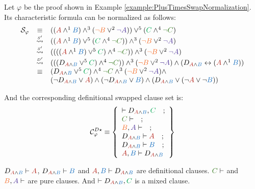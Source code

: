 \begin{example}
\label{example:PlusTimesSwappeDefinitionalNormalization}
Let $\varphi$ be the proof shown in Example \ref{example:PlusTimesSwapNormalization}.
Its characteristic formula can be normalized as follows:
$$
\begin{array}{rcl}
\struct{\varphi} 
& \equiv &
((\hA{A} \structplus^1 \hB{B}) \structplus^3 (\hC{\structdual{B}} \structtimes^2 \hD{\structdual{A}}))
\structtimes^5
(\hE{C} \structplus^4 \hF{\structdual{C}}) \\
%
& \normalizePlusTimesSDs &
	((\hA{A} \structplus^1 \hB{B})\structtimes^5 (\hE{C} \structplus^4 \hF{\structdual{C}}))
\structplus^3 
	(\hC{\structdual{B}} \structtimes^2 \hD{\structdual{A}}) \\
%
& \normalizePlusTimesSDs &
	((((\hA{A} \structplus^1 \hB{B})\structtimes^5 \hE{C}) \structplus^4 \hF{\structdual{C}}))
\structplus^3 
	(\hC{\structdual{B}} \structtimes^2 \hD{\structdual{A}}) \\
%
& \normalizePlusTimesSDd &
	(((D_{\hA{A} \structplus \hB{B}} \structtimes^5 \hE{C}) \structplus^4 \hF{\structdual{C}}))
\structplus^3 
	(\hC{\structdual{B}} \structtimes^2 \hD{\structdual{A}}) 
\structplus
(D_{\hA{A} \structplus \hB{B}} \biimp (\hA{A} \structplus^1 \hB{B})) \\
%
& \equiv &
	(D_{\hA{A} \structplus \hB{B}} \structtimes^5 \hE{C}) 
\structplus^4 
	\hF{\structdual{C}}
\structplus^3 
	(\hC{\structdual{B}} \structtimes^2 \hD{\structdual{A}}) 
\structplus \\
&		   &	
	(\neg D_{\hA{A} \structplus \hB{B}} \structtimes \hA{A} ) 
\structplus
	(\neg D_{\hA{A} \structplus \hB{B}} \structtimes \hB{B} )
\structplus
	(D_{\hA{A} \structplus \hB{B}} \structtimes (\neg \hA{A} \structtimes \neg \hB{B})) \\
\end{array}
$$

\noindent
And the corresponding definitional swapped clause set is:
$$
\clausesetSwapDefUnique{\varphi} \equiv  \left\{ \begin{array}{l}
	\seq D_{\hA{A} \structplus \hB{B}} , \hE{C} 
\ \ \ ; \\
	\hF{C} \seq 
\ \ \ ; \\
	\hC{B} , \hD{A} \seq
\ \ \ ; \\
	D_{\hA{A} \structplus \hB{B}} \seq \hA{A}  
\ \ \ ; \\
	D_{\hA{A} \structplus \hB{B}} \seq \hB{B} 
\ \ \ ; \\
	\hA{A}, \hB{B} \seq D_{\hA{A} \structplus \hB{B}} 
\end{array} \right\}
$$

\noindent
$D_{\hA{A} \structplus \hB{B}} \seq \hA{A}$, $D_{\hA{A} \structplus \hB{B}} \seq \hB{B}$ 
and $\hA{A}, \hB{B} \seq D_{\hA{A} \structplus \hB{B}}$ are definitional clauses. 
$\hF{C} \seq $ and 
$\hC{B} , \hD{A} \seq$ are pure clauses. 
And $\seq D_{\hA{A} \structplus \hB{B}} , \hE{C}$ is a mixed clause.
\hfill\QED
\end{example}


